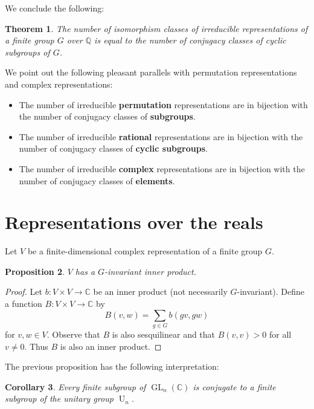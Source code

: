 \documentclass[12pt]{article}
\theoremstyle{plain}
\newtheorem{theorem}{Theorem}[section]
\newtheorem{proposition}[theorem]{Proposition}
\newtheorem{corollary}[theorem]{Corollary}
\theoremstyle{definition}
\theoremstyle{remark}
\numberwithin{equation}{section}
\begin{document}
We conclude the following:

\begin{theorem}
The number of isomorphism classes of irreducible representations of a
finite group $G$ over $\mathbb{Q}$ is equal to the number of conjugacy
classes of cyclic subgroups of $G$.
\end{theorem}

We point out the following pleasant parallels with permutation
representations and complex representations:

\begin{itemize}
\item The number of irreducible \textbf{permutation} representations are in
bijection with the number of conjugacy classes of \textbf{subgroups}.
\item The number of irreducible \textbf{rational} representations are in
bijection with the number of conjugacy classes of \textbf{cyclic
subgroups}.
\item The number of irreducible \textbf{complex} representations are in
bijection with the number of conjugacy classes of \textbf{elements}.
\end{itemize}

\section{Representations over the reals}

Let $V$ be a finite-dimensional
complex representation of a finite group $G$.

\begin{proposition} \label{prop:Ginner}
$V$ has a $G$-invariant inner product.
\end{proposition}

\begin{proof}
Let $b : V \times V \to \mathbb{C}$ be an inner product (not necessarily
$G$-invariant).
Define a function $B : V \times V \to \mathbb{C}$ by
\[
B(v,w) = \sum_{g \in G}b(gv,gw)
\]
for $v, w \in V$.
Observe that $B$ is also sesquilinear
and that $B(v,v) > 0$ for all $v \ne 0$.
Thus $B$ is also an inner product.
\end{proof}

The previous proposition has the following interpretation:

\begin{corollary}
Every finite subgroup of $\operatorname{GL}_n(\mathbb{C})$
is conjugate to a finite subgroup of the unitary group $\operatorname{U}_n$.
\end{corollary}
\end{document}
